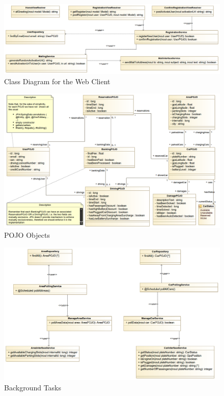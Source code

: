 \documentclass[12pt]{article}
\begin{document}
\begin{figure}[h]
	\centering
	\includegraphics[width=\textwidth]{../Images/WebClient_Class}
	\caption{Class Diagram for the Web Client}
\end{figure}

\begin{figure}[h]
	\centering
	\includegraphics[width=\textwidth]{../Images/POJOs}
	\caption{POJO Objects}
\end{figure}

\begin{figure}[h]
	\centering
	\includegraphics[width=\textwidth]{../Images/BackgroundTasks}
	\caption{Background Tasks}
\end{figure}
\clearpage
\end{document}
